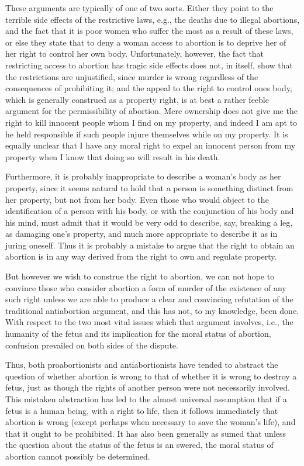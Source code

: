 These arguments are typically of one of two sorts. Either
they point to the terrible side effects of the restrictive
laws, e.g., the deaths due to illegal abortions, and the fact
that it is poor women who suffer the most as a result of
these laws, or else they state that to deny a woman access
to abortion is to deprive her of her right to control her
own body. Unfortunately, however, the fact that
restricting access to abortion has tragic side effects does
not, in itself, show that the restrictions are unjustified,
since murder is wrong regardless of the consequences of
prohibiting it; and the appeal to the right to control ones
body, which is generally construed as a property right, is
at best a rather feeble argument for the permissibility of
abortion. Mere ownership does not give me the right to
kill innocent people whom I find on my property, and
indeed I am apt to he held responsible if such people
injure themselves while on my property. It is equally
unclear that I have any moral right to expel an innocent
person from my property when I know that doing so will
result in his death.

Furthermore, it is probably inappropriate to describe a woman's
body as her property, since it seems natural to hold that a person is
something distinct from her property, but not from her body. Even
those who would object to the identification of a person with his
body, or with the conjunction of his body and his mind, must admit
that it would be very odd to describe, say, breaking a leg, as damaging one's property, and much more appropriate to describe it as in
juring oneself. Thus it is probably a mistake to argue that the right
to obtain an abortion is in any way derived from the right to own
and regulate property.

But however we wish to construe the right to abortion, we can
not hope to convince those who consider abortion a form of murder
of the existence of any such right unless we are able to produce a
clear and convincing refutation of the traditional antiabortion argument, and this has not, to my knowledge, been done. With respect
to the two most vital issues which that argument involves, i.e., the
humanity of the fetus and its implication for the moral status of abortion, confusion prevailed on both sides of the dispute.

Thus, both proabortionists and antiabortionists have tended to abstract the question of whether abortion is wrong to that of whether
it is wrong to destroy a fetus, just as though the rights of another
person were not necessarily involved. This mistaken abstraction has
led to the almost universal assumption that if a fetus is a human
being, with a right to life, then it follows immediately that abortion
is wrong (except perhaps when necessary to save the woman's life),
and that it ought to be prohibited. It has also been generally as
sumed that unless the question about the status of the fetus is an
swered, the moral status of abortion cannot possibly be determined.

